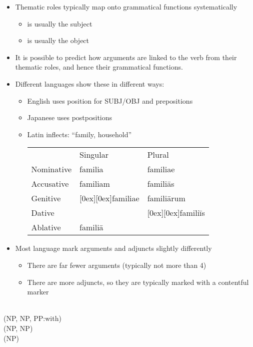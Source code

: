 \documentclass[headrule,footrule]{foils}
\begin{document}
\begin{itemize}
\item    Thematic roles typically map onto grammatical 
  functions systematically
  \begin{itemize}
  \item  {} is usually the subject
  \item  {} is usually the object
  \end{itemize}
\item  It is possible to predict how arguments are linked to 
the verb from their thematic roles, and hence their 
grammatical functions.
\item Different languages show these in different ways:
  \begin{itemize}
  \item English uses position for SUBJ/OBJ and prepositions
  \item Japanese uses postpositions
\newpage
  \item Latin inflects:   ``family, household''
\\    \begin{tabular}{lll}
 & Singular & 	Plural \\
Nominative & 	familia & 	familiae\\
Accusative & 	familiam & 	familiās\\
Genitive & 	\raisebox{-1ex}[0ex][0ex]{familiae} & 	familiārum\\
Dative &    &		\raisebox{-1ex}[0ex][0ex]{familiīs}  \\
Ablative & 	familiā & 	 \\
    \end{tabular}

  \end{itemize}
\item Most language mark arguments and adjuncts slightly differently
  \begin{itemize}
  \item There are far fewer arguments (typically not more than 4)
  \item There are more adjuncts, so they are typically marked with a
    contentful marker
  \end{itemize}
\end{itemize}

\begin{exe}
  \ex {}
  \\    (NP, NP, PP:with)
  \ex {}
  \\   (NP, NP)
  \ex {}  
  \\  (NP)
\end{exe}
\end{document}
